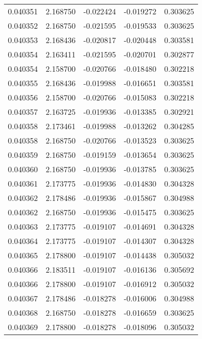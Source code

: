 \begin{tabular}{lrrrr}
0.040351    &  2.168750 & -0.022424 & -0.019272 &             0.303625 \\
0.040352    &  2.168750 & -0.021595 & -0.019533 &             0.303625 \\
0.040353    &  2.168436 & -0.020817 & -0.020448 &             0.303581 \\
0.040354    &  2.163411 & -0.021595 & -0.020701 &             0.302877 \\
0.040354    &  2.158700 & -0.020766 & -0.018480 &             0.302218 \\
0.040355    &  2.168436 & -0.019988 & -0.016651 &             0.303581 \\
0.040356    &  2.158700 & -0.020766 & -0.015083 &             0.302218 \\
0.040357    &  2.163725 & -0.019936 & -0.013385 &             0.302921 \\
0.040358    &  2.173461 & -0.019988 & -0.013262 &             0.304285 \\
0.040358    &  2.168750 & -0.020766 & -0.013523 &             0.303625 \\
0.040359    &  2.168750 & -0.019159 & -0.013654 &             0.303625 \\
0.040360    &  2.168750 & -0.019936 & -0.013785 &             0.303625 \\
0.040361    &  2.173775 & -0.019936 & -0.014830 &             0.304328 \\
0.040362    &  2.178486 & -0.019936 & -0.015867 &             0.304988 \\
0.040362    &  2.168750 & -0.019936 & -0.015475 &             0.303625 \\
0.040363    &  2.173775 & -0.019107 & -0.014691 &             0.304328 \\
0.040364    &  2.173775 & -0.019107 & -0.014307 &             0.304328 \\
0.040365    &  2.178800 & -0.019107 & -0.014438 &             0.305032 \\
0.040366    &  2.183511 & -0.019107 & -0.016136 &             0.305692 \\
0.040366    &  2.178800 & -0.019107 & -0.016912 &             0.305032 \\
0.040367    &  2.178486 & -0.018278 & -0.016006 &             0.304988 \\
0.040368    &  2.168750 & -0.018278 & -0.016659 &             0.303625 \\
0.040369    &  2.178800 & -0.018278 & -0.018096 &             0.305032 \\

\end{tabular}
